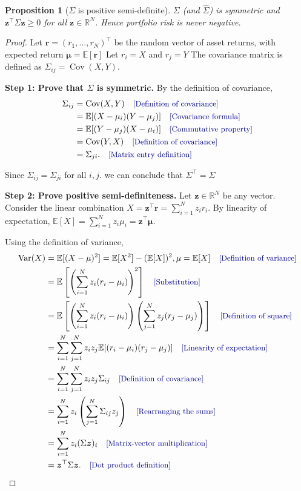 \documentclass[11pt]{article}
\theoremstyle{plain}
\newtheorem{proposition}[theorem]{Proposition}
\theoremstyle{definition}
\newcommand{\R}{\mathbb{R}}
\newcommand{\bmu}{\bm{\mu}}
\newcommand{\by}[1]{\quad\text{\small\color{blue!60!black}[#1]}}   %
\begin{document}
\begin{proposition}[$\Sigma$ is positive semi-definite]\label{prop:q2}
$\Sigma$ (and $\hat\Sigma$) is symmetric and $\bm z^\top\Sigma\bm z\ge 0$ for all $\bm z\in\R^N$. Hence portfolio risk is never negative.
\end{proposition}
\begin{proof}
Let $\bm r=(r_1, \ldots, r_N)^\top$ be the random vector of asset returns, with expected return $\bmu=\mathbb{E}[\bm r]$
Let $r_i = X$ and $r_j = Y$
The covariance matrix is defined as $\Sigma_{ij}=\operatorname{Cov}(X, Y).$

\textbf{Step 1: Prove that $\Sigma$ is symmetric.}
By the definition of covariance,
\begin{align*}
\Sigma_{ij}
&=\operatorname{Cov}(X, Y)
\by{Definition of covariance}\\
&=\mathbb{E}[(X -\mu_i)(Y-\mu_j)]
\by{Covariance formula}\\
&=\mathbb{E}[(Y-\mu_j)(X-\mu_i)]
\by{Commutative property}\\
&=\operatorname{Cov}(Y,X)
\by{Definition of covariance}\\
&=\Sigma_{ji}.
\by{Matrix entry definition}
\end{align*}

Since $\Sigma_{ij}=\Sigma_{ji}$ for all $i,j$. we can conclude that $\Sigma^\top=\Sigma$

\textbf{Step 2: Prove positive semi-definiteness.}
Let $\bm z\in\mathbb{R}^N$ be any vector.
Consider the linear combination $X=\bm z^\top\bm r =\sum_{i=1}^N z_i r_i.$
By linearity of expectation,
$\mathbb{E}[X]=\sum_{i=1}^N z_i\mu_i=\bm z^\top\bmu.$

Using the definition of variance,
\begin{align*}
\operatorname{Var}(X)
&=\mathbb{E}[(X-\mu)^2] = \mathbb{E}[X^2] - (\mathbb{E}[X])^2, \mu = \mathbb{E}[X]
\by{Definition of variance}\\
&=\mathbb{E}\left[
\left(\sum_{i=1}^{N}z_i(r_i-\mu_i)\right)^2
\right]
\by{Substitution}\\
&=\mathbb{E}\left[
\left(\sum_{i=1}^{N}z_i(r_i-\mu_i)\right)
\left(\sum_{j=1}^{N}z_j(r_j-\mu_j)\right)
\right]
\by{Definition of square}\\
&=\sum_{i=1}^{N}\sum_{j=1}^{N}
z_i z_j\mathbb{E}[
(r_i-\mu_i)(r_j-\mu_j)]
\by{Linearity of expectation}\\
&=\sum_{i=1}^N\sum_{j=1}^N
z_i z_j\Sigma_{ij}
\by{Definition of covariance}\\
&=\sum_{i=1}^{N}
z_i\left(\sum_{j=1}^{N}\Sigma_{ij}z_j\right)
\by{Rearranging the sums}\\
&=\sum_{i=1}^{N}z_i(\Sigma\bm z)_i
\by{Matrix-vector multiplication}\\
&=\bm z^\top\Sigma\bm z.
\by{Dot product definition}
\end{align*}


\end{proof}
\end{document}
